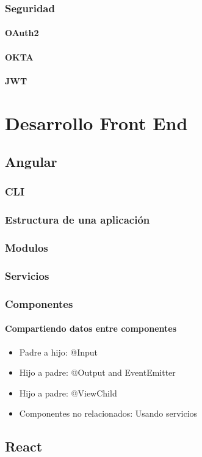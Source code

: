 \documentclass[12pt,article,oneside]{memoir}
\begin{document}
		\section{Seguridad}
			\subsection{OAuth2}
			\subsection{OKTA}
			\subsection{JWT}
	\newpage
			
\part{  Desarrollo Front End}
	\chapter{Angular}
	\newpage
		\section{CLI}
	\newpage
	 	\section{Estructura de una aplicaci\'on}
	\newpage
		\section{Modulos}
	\newpage
		\section{Servicios}
	\newpage
		\section{Componentes}
			\subsection{Compartiendo datos entre componentes}
				\begin{itemize}
					\item Padre a hijo: @Input
					\item Hijo a padre: @Output and EventEmitter
					\item Hijo a padre: @ViewChild
					\item Componentes no relacionados: Usando servicios
				\end{itemize}
	\newpage
	
	\chapter{React}
	\newpage
	
\end{document}

